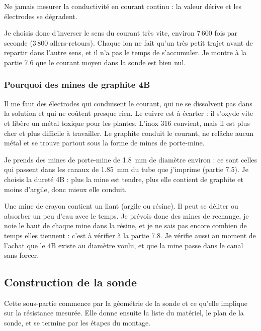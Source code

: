 \begin{attention}
Ne jamais mesurer la conductivité en courant continu : la valeur dérive et les électrodes se dégradent.
\end{attention}

Je choisis donc d'inverser le sens du courant très vite, environ 7\,600 fois par seconde (3\,800 allers-retours). Chaque ion ne fait qu'un très petit trajet avant de repartir dans l'autre sens, et il n'a pas le temps de s'accumuler. Je montre à la partie 7.6 que le courant moyen dans la sonde est bien nul.

\subsubsection*{Pourquoi des mines de graphite 4B}

Il me faut des électrodes qui conduisent le courant, qui ne se dissolvent pas dans la solution et qui ne coûtent presque rien. Le cuivre est à écarter : il s'oxyde vite et libère un métal toxique pour les plantes. L'inox 316 convient, mais il est plus cher et plus difficile à travailler. Le graphite conduit le courant, ne relâche aucun métal et se trouve partout sous la forme de mines de porte-mine.

Je prends des mines de porte-mine de \qty{1,8}{mm} de diamètre environ : ce sont celles qui passent dans les canaux de \qty{1,85}{mm} du tube que j'imprime (partie 7.5). Je choisis la dureté 4B : plus la mine est tendre, plus elle contient de graphite et moins d'argile, donc mieux elle conduit.

\begin{attention}
Une mine de crayon contient un liant (argile ou résine). Il peut se déliter ou absorber un peu d'eau avec le temps. Je prévois donc des mines de rechange, je noie le haut de chaque mine dans la résine, et je ne sais pas encore combien de temps elles tiennent : c'est à vérifier à la partie 7.8. Je vérifie aussi au moment de l'achat que le 4B existe au diamètre voulu, et que la mine passe dans le canal sans forcer.
\end{attention}

\subsection{Construction de la sonde}

Cette sous-partie commence par la géométrie de la sonde et ce qu'elle implique sur la résistance mesurée. Elle donne ensuite la liste du matériel, le plan de la sonde, et se termine par les étapes du montage.

